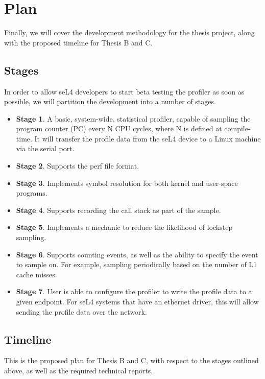 \chapter{Plan}\label{ch:plan}

Finally, we will cover the development methodology for the thesis project, along with the proposed timeline for Thesis B and C.

\section{Stages}

In order to allow seL4 developers to start beta testing the profiler as soon as possible, we will partition the development into a number of stages.

\ssp\begin{itemize}
    \item \textbf{Stage 1}. A basic, system-wide, statistical profiler, capable of sampling the program counter (PC) every N CPU cycles, where N is defined at compile-time. It will transfer the profile data from the seL4 device to a Linux machine via the serial port.
    \item \textbf{Stage 2}. Supports the perf file format.
    \item \textbf{Stage 3}. Implements symbol resolution for both kernel and user-space programs. 
    \item \textbf{Stage 4}. Supports recording the call stack as part of the sample.
    \item \textbf{Stage 5}. Implements a mechanic to reduce the likelihood of lockstep sampling.
    \item \textbf{Stage 6}. Supports counting events, as well as the ability to specify the event to sample on. For example, sampling periodically based on the number of L1 cache misses.
    \item \textbf{Stage 7}. User is able to configure the profiler to write the profile data to a given endpoint. For seL4 systems that have an ethernet driver, this will allow sending the profile data over the network.
\end{itemize}\dsp

\section{Timeline}

This is the proposed plan for Thesis B and C, with respect to the stages outlined above, as well as the required technical reports.

